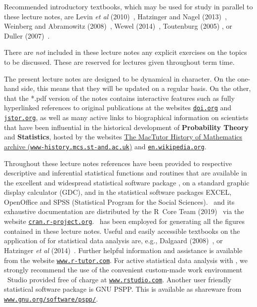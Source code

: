 \medskip
\noindent
Recommended introductory textbooks, which may be used for study in 
parallel to these lecture notes, are Levin \textit{et al} 
(2010)~, Hatzinger and Nagel 
(2013)~, Weinberg and Abramowitz
(2008)~, Wewel (2014)~, Toutenburg 
(2005) , or Duller (2007)~.

\medskip
\noindent
There are \textit{not} included in these lecture notes any explicit 
exercises on the topics to be discussed. These are 
reserved for lectures given throughout term time.

\medskip
\noindent
The present lecture notes are designed to be dynamical in 
character. On the one-hand side, this means that they will be 
updated on a regular basis. On the other, that the *.pdf version 
of the notes contains interactive features such as fully 
hyperlinked references to original publications at the websites 
\href{https://doi.org}{\texttt{doi.org}} and 
\href{http://www.jstor.org}{\texttt{jstor.org}}, as well as many 
active links to biographical information on scientists that have 
been influential in the historical development of
\textbf{Probability Theory} and \textbf{Statistics}, hosted by the
websites \href{http://www-history.mcs.st-and.ac.uk/}{The MacTutor
History of Mathematics archive
({\tt www-history.mcs.st-and.ac.uk})} and
\href{http://en.wikipedia.org/wiki/Main_Page}{\texttt{en.wikipedia.org}}.

\medskip
\noindent
Throughout these lecture notes references have been provided to
respective descriptive and inferential statistical functions and
routines that are available in the excellent and widespread
statistical software package \R{}, on a standard graphic display
calculator (GDC), and in the statistical software packages EXCEL,
OpenOffice and SPSS (Statistical Program for the Social Sciences).
\R{}~and its exhaustive documentation are distributed by the
R~Core Team (2019)~ via the website
\href{http://cran.r-project.org}{\texttt{cran.r-project.org}}.
\R{}~has been employed for generating all the figures contained in
these lecture notes. Useful and easily accessible textbooks on the
application of \R{} for statistical data analysis are, e.g.,
Dalgaard (2008)~, or Hatzinger \textit{et al} 
(2014)~. Further helpful information and 
assistance is available from the website 
\href{http://www.r-tutor.com/}{\texttt{www.r-tutor.com}}. For
active statistical data analysis with \R{}, we strongly recommend
the use of the convenient custom-made work environment \R{}~Studio
provided free of charge at \href{http://www.rstudio.com}{\texttt{www.rstudio.com}}. Another user friendly statistical software
package is GNU PSPP. This is available as shareware from 
\href{http://www.gnu.org/software/pspp/}{\texttt{www.gnu.org/software/pspp/}}.

